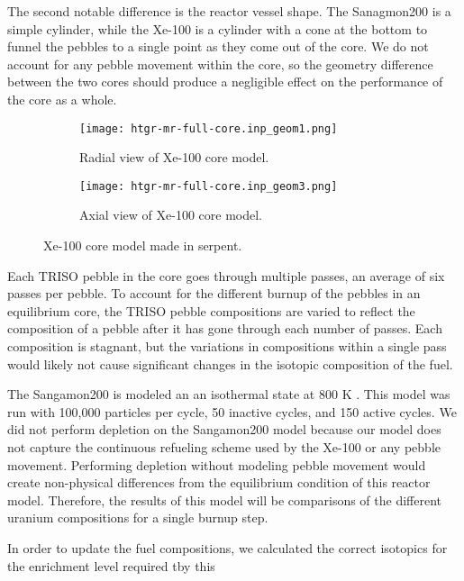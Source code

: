 The second 
notable difference is the reactor vessel shape. The Sanagmon200 is a simple 
cylinder, while the Xe-100 is a cylinder with a cone at the bottom to funnel 
the pebbles to a single point as they come out of the core. We do not account 
for any pebble movement within the core, so the geometry difference between 
the two cores should produce a negligible effect on the performance of the 
core as a whole.

\begin{figure}
    \centering 
    \begin{subfigure}{0.45\textwidth}
        \centering 
        \texttt{[image: htgr-mr-full-core.inp\_geom1.png]}
        \caption{Radial view of Xe-100 core model.}
        \label{fig:xe100_core_radial}        
    \end{subfigure}
    \hfill
    \begin{subfigure}{0.45\textwidth}
        \centering 
        \texttt{[image: htgr-mr-full-core.inp\_geom3.png]}
        \caption{Axial view of Xe-100 core model.}
        \label{fig:xe100_core_axial}        
    \end{subfigure}
    \caption{Xe-100 core model made in serpent.}
    \label{fig:xe100_core}
\end{figure}

Each \gls{TRISO} pebble in the core goes through multiple passes, an average 
of six passes per pebble. To account for the different burnup of 
the pebbles in an equilibrium core, the \gls{TRISO} pebble compositions are 
varied to reflect the composition of a pebble after it has gone through 
each number of passes. Each composition is stagnant, 
but the variations in 
compositions within a single pass would likely not cause significant 
changes in the isotopic composition of the fuel. 

The Sangamon200 is modeled an an isothermal state at 800 K \cite{richter_isotopic_2022}.
This model was run with 100,000 particles per cycle, 50 inactive cycles, 
and 150 active cycles. We did not perform depletion on the Sangamon200 model 
because our model 
does not capture the continuous refueling scheme used by the Xe-100 or 
any pebble movement. Performing depletion without modeling pebble movement 
would create non-physical differences from the equilibrium condition of 
this reactor model. Therefore, the results of this model will be comparisons
of the different uranium compositions for a single burnup step.

In order to update the fuel compositions, we calculated the correct 
isotopics for the enrichment level required tby this

